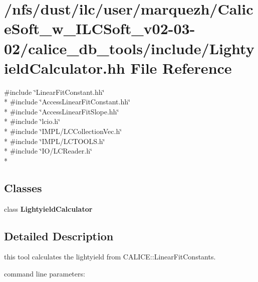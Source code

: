 \section{/nfs/dust/ilc/user/marquezh/\-Calice\-Soft\-\_\-w\-\_\-\-I\-L\-C\-Soft\-\_\-v02-\/03-\/02/calice\-\_\-db\-\_\-tools/include/\-Lightyield\-Calculator.hh File Reference}
\label{LightyieldCalculator_8hh}
{\ttfamily \#include \char`\"{}Linear\-Fit\-Constant.\-hh\char`\"{}}\\*
{\ttfamily \#include \char`\"{}Access\-Linear\-Fit\-Constant.\-hh\char`\"{}}\\*
{\ttfamily \#include \char`\"{}Access\-Linear\-Fit\-Slope.\-hh\char`\"{}}\\*
{\ttfamily \#include \char`\"{}lcio.\-h\char`\"{}}\\*
{\ttfamily \#include \char`\"{}I\-M\-P\-L/\-L\-C\-Collection\-Vec.\-h\char`\"{}}\\*
{\ttfamily \#include \char`\"{}I\-M\-P\-L/\-L\-C\-T\-O\-O\-L\-S.\-h\char`\"{}}\\*
{\ttfamily \#include \char`\"{}I\-O/\-L\-C\-Reader.\-h\char`\"{}}\\*
\subsection*{Classes}
\begin{DoxyCompactItemize}
\item 
class {\bf Lightyield\-Calculator}
\end{DoxyCompactItemize}


\subsection{Detailed Description}
this tool calculates the lightyield from C\-A\-L\-I\-C\-E\-::\-Linear\-Fit\-Constants.

command line parameters\-:


